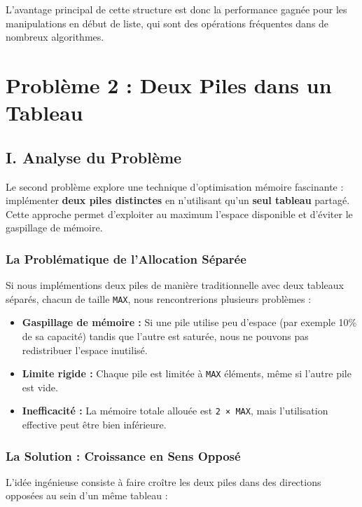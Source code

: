 \documentclass[a4paper, 11pt]{article}
\begin{document}
L'avantage principal de cette structure est donc la performance gagnée pour les manipulations en début de liste, qui sont des opérations fréquentes dans de nombreux algorithmes.

\section{Problème 2 : Deux Piles dans un Tableau}

\subsection{I. Analyse du Problème}

Le second problème explore une technique d'optimisation mémoire fascinante : implémenter \textbf{deux piles distinctes} en n'utilisant qu'un \textbf{seul tableau} partagé. Cette approche permet d'exploiter au maximum l'espace disponible et d'éviter le gaspillage de mémoire.

\subsubsection*{La Problématique de l'Allocation Séparée}

Si nous implémentions deux piles de manière traditionnelle avec deux tableaux séparés, chacun de taille \texttt{MAX}, nous rencontrerions plusieurs problèmes :

\begin{itemize}
    \item \textbf{Gaspillage de mémoire :} Si une pile utilise peu d'espace (par exemple 10\% de sa capacité) tandis que l'autre est saturée, nous ne pouvons pas redistribuer l'espace inutilisé.
    \item \textbf{Limite rigide :} Chaque pile est limitée à \texttt{MAX} éléments, même si l'autre pile est vide.
    \item \textbf{Inefficacité :} La mémoire totale allouée est \texttt{2 × MAX}, mais l'utilisation effective peut être bien inférieure.
\end{itemize}



\subsubsection*{La Solution : Croissance en Sens Opposé}

L'idée ingénieuse consiste à faire croître les deux piles dans des directions opposées au sein d'un même tableau :
\end{document}
